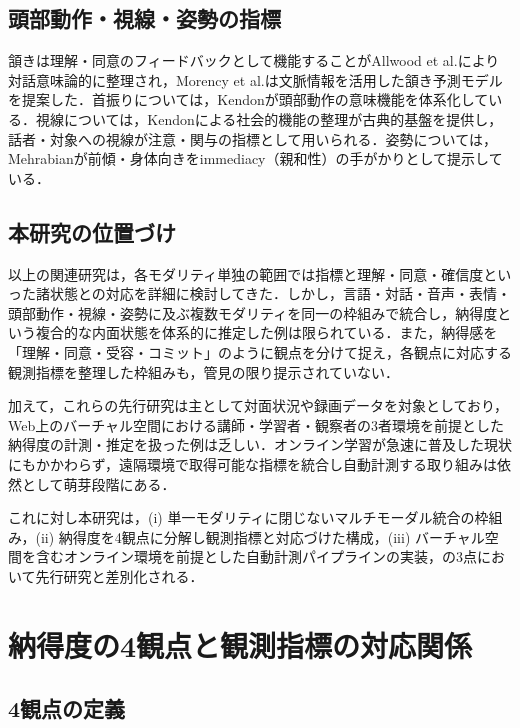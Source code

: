 \documentclass[Japanese]{dicomopapers}
\begin{document}
\subsection{頭部動作・視線・姿勢の指標}

頷きは理解・同意のフィードバックとして機能することがAllwood et al.\cite{Allwood1992}により対話意味論的に整理され，Morency et al.\cite{Morency2007}は文脈情報を活用した頷き予測モデルを提案した．首振りについては，Kendon\cite{Kendon2002}が頭部動作の意味機能を体系化している．視線については，Kendon\cite{Kendon1967}による社会的機能の整理が古典的基盤を提供し，話者・対象への視線が注意・関与の指標として用いられる．姿勢については，Mehrabian\cite{Mehrabian1971}が前傾・身体向きをimmediacy（親和性）の手がかりとして提示している．

\subsection{本研究の位置づけ}

以上の関連研究は，各モダリティ単独の範囲では指標と理解・同意・確信度といった諸状態との対応を詳細に検討してきた．しかし，言語・対話・音声・表情・頭部動作・視線・姿勢に及ぶ複数モダリティを同一の枠組みで統合し，納得度という複合的な内面状態を体系的に推定した例は限られている．また，納得感を「理解・同意・受容・コミット」のように観点を分けて捉え，各観点に対応する観測指標を整理した枠組みも，管見の限り提示されていない．

加えて，これらの先行研究は主として対面状況や録画データを対象としており，Web上のバーチャル空間における講師・学習者・観察者の3者環境を前提とした納得度の計測・推定を扱った例は乏しい．オンライン学習が急速に普及した現状にもかかわらず，遠隔環境で取得可能な指標を統合し自動計測する取り組みは依然として萌芽段階にある．

これに対し本研究は，(i) 単一モダリティに閉じないマルチモーダル統合の枠組み，(ii) 納得度を4観点に分解し観測指標と対応づけた構成，(iii) バーチャル空間を含むオンライン環境を前提とした自動計測パイプラインの実装，の3点において先行研究と差別化される．

\section{納得度の4観点と観測指標の対応関係}
\label{sec:matching}

\subsection{4観点の定義}
\end{document}
